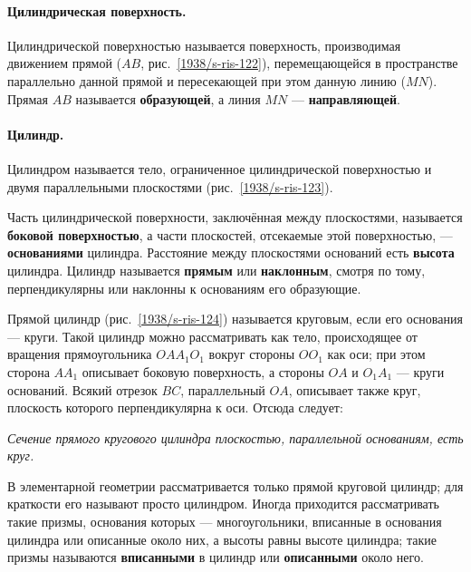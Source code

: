 \paragraph{Цилиндрическая поверхность.}\label{1938/s106}
Цилиндрической поверхностью называется поверхность, производимая движением прямой ($AB$, рис.~\ref{1938/s-ris-122}), перемещающейся в пространстве параллельно данной прямой и пересекающей при этом данную линию ($MN$).
Прямая $AB$ называется \textbf{образующей}, а линия $MN$ — \textbf{направляющей}.

\paragraph{Цилиндр.}\label{1938/s107}
Цилиндром называется тело, ограниченное цилиндрической поверхностью и двумя параллельными плоскостями (рис.~\ref{1938/s-ris-123}).

Часть цилиндрической поверхности, заключённая между плоскостями, называется \textbf{боковой поверхностью}, а части плоскостей, отсекаемые этой поверхностью, — \textbf{основаниями} цилиндра.
Расстояние между плоскостями оснований есть \textbf{высота} цилиндра.
Цилиндр называется \textbf{прямым} или \textbf{наклонным}, смотря по тому, перпендикулярны или наклонны к основаниям его образующие.

Прямой цилиндр (рис.~\ref{1938/s-ris-124}) называется круговым, если его основания — круги.
Такой цилиндр можно рассматривать как тело, происходящее от вращения прямоугольника $OAA_1O_1$ вокруг стороны $OO_1$ как оси;
при этом сторона $AA_1$ описывает боковую поверхность, а стороны $OA$ и $O_1A_1$ — круги оснований.
Всякий отрезок $BC$, параллельный $OA$, описывает также круг, плоскость которого перпендикулярна к оси.
Отсюда следует:

\emph{Сечение прямого кругового цилиндра плоскостью, параллельной основаниям, есть круг.}

В элементарной геометрии рассматривается только прямой круговой цилиндр;
для краткости его называют просто цилиндром.
Иногда приходится рассматривать такие призмы, основания которых — многоугольники, вписанные в основания цилиндра или описанные около них, а высоты равны высоте цилиндра;
такие призмы называются \textbf{вписанными} в цилиндр или \textbf{описанными} около него.

